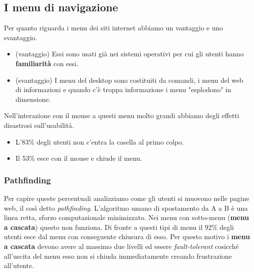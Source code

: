 		\subsection{I menu di navigazione}
			Per quanto riguarda i menu dei siti internet abbiamo un vantaggio e uno svantaggio.
			\begin{itemize}
				\item (vantaggio) Essi sono usati già nei sistemi operativi per cui gli utenti hanno \textbf{familiarità} con essi.
				\item (svantaggio) I menu del desktop sono costituiti da comandi, i menu del web di informazioni e quando c'è troppa informazione i menu "esplodono" in dimensione.
			\end{itemize}
			Nell'interazione con il mouse a questi menu molto grandi abbiamo degli effetti disastrosi sull'usabilità.
			\begin{itemize}
				\item L'83\% degli utenti non c'entra la casella al primo colpo.
				\item Il 53\% esce con il mouse e chiude il menu.
			\end{itemize}

			\subsubsection{Pathfinding}
				Per capire queste percentuali analizziamo come gli utenti si muovono nelle pagine web, il così detto \emph{pathfinding}. L'algoritmo umano di spostamento da A a B è una linea retta, sforzo computazionale minimizzato. Nei menu con sotto-menu (\textbf{menu a cascata}) questo non funziona. Di fronte a questi tipi di menu il 92\% degli utenti esce dal menu con conseguente chiusura di esso. Per questo motivo i \textbf{menu a cascata} devono avere al massimo due livelli ed essere \emph{fault-tolerant} cosicché all'uscita del menu esso non si chiuda immediatamente creando frustrazione all'utente.
			
